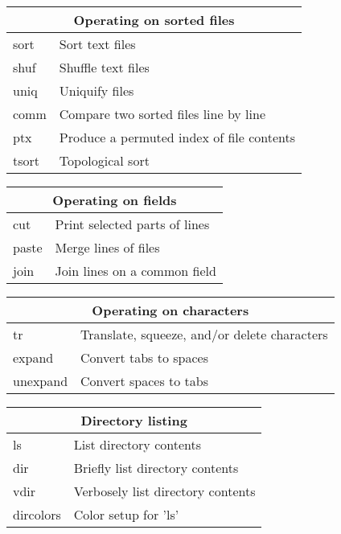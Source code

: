 \begin{tabularx}{0.75\textwidth}{|l|X|}
\hline
\multicolumn{2}{|c|}{Operating on sorted files}\\ \hline
sort  &               Sort text files\\
shuf  &               Shuffle text files\\
uniq  &               Uniquify files\\
comm  &               Compare two sorted files line by line\\
ptx  &                Produce a permuted index of file contents\\
tsort  &              Topological sort\\
\hline
\end{tabularx}

\begin{tabularx}{0.75\textwidth}{|l|X|}
\hline
\multicolumn{2}{|c|}{Operating on fields}\\ \hline
cut  &                Print selected parts of lines\\
paste  &              Merge lines of files\\
join  &               Join lines on a common field\\
\hline
\end{tabularx}

\begin{tabularx}{0.75\textwidth}{|l|X|}
\hline
\multicolumn{2}{|c|}{Operating on characters}\\ \hline
tr  &                 Translate, squeeze, and/or delete characters\\
expand  &             Convert tabs to spaces\\
unexpand  &           Convert spaces to tabs\\
\hline
\end{tabularx}

\begin{tabularx}{0.75\textwidth}{|l|X|}
\hline
\multicolumn{2}{|c|}{Directory listing}\\ \hline
ls  &                 List directory contents\\
dir  &                Briefly list directory contents\\
vdir  &               Verbosely list directory contents\\
dircolors  &          Color setup for 'ls'\\
\hline
\end{tabularx}

